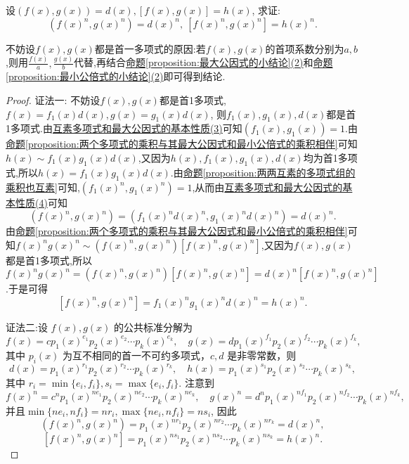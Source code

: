 \documentclass[../../main.tex]{subfiles}
\begin{document}
\begin{proposition}[最大公因式与最小公倍式在开方下不变]\label{proposition:两个多项式的最大公因式与最小公倍式的n次方就是它们n次方的最大公因式与最小公倍式}
设\((f(x),g(x)) = d(x), [f(x),g(x)] = h(x)\), 求证:
\[
(f(x)^n,g(x)^n)=d(x)^n, \ [f(x)^n,g(x)^n]=h(x)^n.
\]
\end{proposition}
\begin{remark}
不妨设\(f(x),g(x)\)都是首一多项式的原因:若$f(x),g(x)$的首项系数分别为$a,b$,则用$\frac{f(x)}{a},\frac{g(x)}{b}$代替,再结合\hyperref[proposition:最大公因式的小结论]{命题\ref{proposition:最大公因式的小结论}(2)}和\hyperref[proposition:最小公倍式的小结论]{命题\ref{proposition:最小公倍式的小结论}(2)}即可得到结论.
\end{remark}
\begin{proof}
{\color{blue}证法一:}
不妨设\(f(x),g(x)\)都是首1多项式, \(f(x)=f_1(x)d(x), g(x)=g_1(x)d(x)\), 则$f_1(x),g_1(x),d(x)$都是首1多项式.由\hyperref[proposition:互素多项式和最大公因式的基本性质]{互素多项式和最大公因式的基本性质(3)}可知\((f_1(x),g_1(x)) = 1\).由\hyperref[proposition:两个多项式的乘积与其最大公因式和最小公倍式的乘积相伴]{命题\ref{proposition:两个多项式的乘积与其最大公因式和最小公倍式的乘积相伴}}可知\(h(x)\sim f_1(x)g_1(x)d(x)\),又因为$h(x),f_1(x),g_1(x),d(x)$均为首1多项式,所以\(h(x)=f_1(x)g_1(x)d(x)\).由\hyperref[proposition:两两互素的多项式组的乘积也互素]{命题\ref{proposition:两两互素的多项式组的乘积也互素}}可知,\((f_1(x)^n,g_1(x)^n)=1\),从而由\hyperref[proposition:互素多项式和最大公因式的基本性质]{互素多项式和最大公因式的基本性质(4)}可知
\[
(f(x)^n,g(x)^n)=(f_1(x)^nd(x)^n,g_1(x)^nd(x)^n)=d(x)^n.
\]
由\hyperref[proposition:两个多项式的乘积与其最大公因式和最小公倍式的乘积相伴]{命题\ref{proposition:两个多项式的乘积与其最大公因式和最小公倍式的乘积相伴}}可知\(f(x)^ng(x)^n\sim (f(x)^n,g(x)^n)[f(x)^n,g(x)^n]\),又因为$f(x),g(x)$都是首1多项式,所以\(f(x)^ng(x)^n=(f(x)^n,g(x)^n)[f(x)^n,g(x)^n]=d(x)^n[f(x)^n,g(x)^n]\).于是可得
\[
[f(x)^n,g(x)^n]=f_1(x)^ng_1(x)^nd(x)^n=h(x)^n.
\]

{\color{blue}证法二:}设 \(f(x), g(x)\) 的公共标准分解为
\[
f(x) = cp_1(x)^{e_1}p_2(x)^{e_2} \cdots p_k(x)^{e_k}, \quad g(x) = dp_1(x)^{f_1}p_2(x)^{f_2} \cdots p_k(x)^{f_k},
\]
其中 \(p_i(x)\) 为互不相同的首一不可约多项式，\(c, d\) 是非零常数，则
\[
d(x) = p_1(x)^{r_1}p_2(x)^{r_2} \cdots p_k(x)^{r_k}, \quad h(x) = p_1(x)^{s_1}p_2(x)^{s_2} \cdots p_k(x)^{s_k},
\]
其中 \(r_i = \min\{e_i, f_i\}, s_i = \max\{e_i, f_i\}\). 注意到
\[
f(x)^n = c^n p_1(x)^{ne_1}p_2(x)^{ne_2} \cdots p_k(x)^{ne_k}, \quad g(x)^n = d^n p_1(x)^{nf_1}p_2(x)^{nf_2} \cdots p_k(x)^{nf_k},
\]
并且\(\min\{ne_i, nf_i\} = nr_i, \max\{ne_i, nf_i\} = ns_i\), 因此
\[
(f(x)^n, g(x)^n) = p_1(x)^{nr_1}p_2(x)^{nr_2} \cdots p_k(x)^{nr_k} = d(x)^n,
\]
\[
[f(x)^n, g(x)^n] = p_1(x)^{ns_1}p_2(x)^{ns_2} \cdots p_k(x)^{ns_k} = h(x)^n.
\]
\end{proof}
\end{document}
